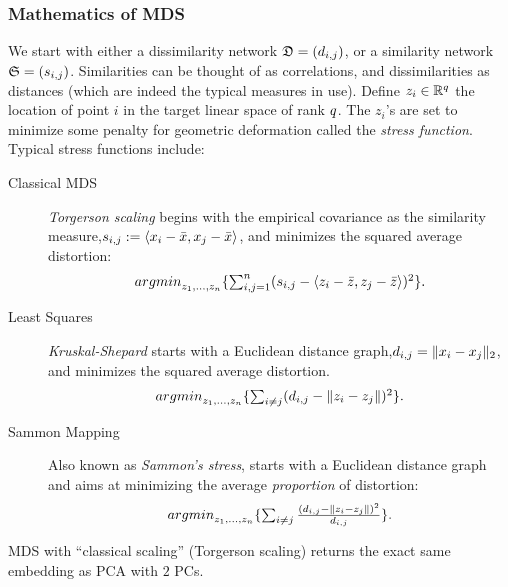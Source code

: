 \documentclass[12pt,a4paper]{article}
\begin{document}
\subsubsection{Mathematics of MDS}
We start with either a dissimilarity network $\mathfrak{D}=(d_{i,j})$, or a similarity network $\mathfrak{S}=(s_{i,j})$.
Similarities can be thought of as correlations, and dissimilarities as distances (which are indeed the typical measures in use).
Define $z_i \in \mathbb{R}^q$ the location of point $i$ in the target linear space of rank $q$. 
The $z_i$'s are set to minimize some penalty for geometric deformation called the \emph{stress function}.
Typical stress functions include:
\begin{description}
	
	\item[Classical MDS] \Aka \emph{Torgerson scaling} begins with the empirical covariance as the similarity measure,$s_{i,j}:= \left< x_i-\bar x,x_j-\bar{x} \right>$, and minimizes the squared average distortion:
	\begin{align}
	\label{eq:mds_classical}
	\textstyle{\mathop{argmin}_{z_1,\dots,z_n}}\{ \sum_{i,j=1}^{n} (s_{i,j}-\left< z_i-\bar z,z_j-\bar{z} \right> )^2 \}.
	\end{align}
	
	\item[Least Squares] \Aka \emph{Kruskal-Shepard} starts with a Euclidean distance graph,$d_{i,j}= \Vert x_i-x_j \Vert_2$, and minimizes the squared average distortion. 
	\begin{align}
	\label{eq:mds_stress}
	\textstyle{\mathop{argmin}_{z_1,\dots,z_n}}\{ \sum_{i \neq j} (d_{i,j}-\Vert z_i-z_j \Vert )^2 \}.
	\end{align}
	
	\item[Sammon Mapping] Also known as \emph{Sammon's stress}, starts with a Euclidean distance graph and aims at minimizing the average \emph{proportion} of distortion:
	\begin{align}
	\label{eq:mds_sammon}
	\textstyle{\mathop{argmin}_{z_1,\dots,z_n}}\{ \sum_{i \neq j} \frac{(d_{i,j}-\Vert z_i-z_j \Vert )^2}{d_{i,j}} \}.
	\end{align}
	
\end{description}




\begin{remark}
	MDS with ``classical scaling'' (\aka Torgerson scaling) returns the exact same embedding as PCA with $2$ PCs.
\end{remark}
\end{document}
